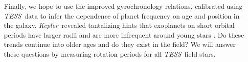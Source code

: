 \documentclass[useAMS, usenatbib, preprint, 12pt]{aastex}
\newcommand{\Kepler}{{\it Kepler}}
\newcommand{\kepler}{\Kepler}
\newcommand{\TESS}{{\it TESS}}
\begin{document}
Finally, we hope to use the improved gyrochronology relations, calibrated
using \TESS\ data to infer the dependence of planet frequency on age and
position in the galaxy.
\kepler\ revealed tantalizing hints that exoplanets on short orbital periods
have larger radii and are more infrequent around young stars \citep{mann2017a,
mann2017b, rizzuto2017}.
Do these trends continue into older ages and do they exist in the field?
We will answer these questions by measuring rotation periods for all \TESS\
field stars.



\end{document}

